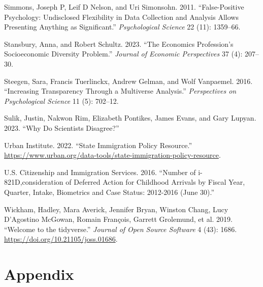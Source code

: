 \documentclass[
  letterpaper,
  DIV=11,
  numbers=noendperiod]{scrartcl}
\newlength{\cslhangindent}
\newlength{\cslentryspacingunit} %
\newenvironment{CSLReferences}[2] %
 {%
  \setlength{\parindent}{0pt}
  \ifodd #1
  \let\oldpar\par
  \def\par{\hangindent=\cslhangindent\oldpar}
  \fi
  \setlength{\parskip}{#2\cslentryspacingunit}
 }%
 {}
\begin{document}
\begin{CSLReferences}{1}{0}
\leavevmode{}%
Simmons, Joseph P, Leif D Nelson, and Uri Simonsohn. 2011.
{``False-Positive Psychology: Undisclosed Flexibility in Data Collection
and Analysis Allows Presenting Anything as Significant.''}
\emph{Psychological Science} 22 (11): 1359--66.

\leavevmode{}%
Stansbury, Anna, and Robert Schultz. 2023. {``The Economics Profession's
Socioeconomic Diversity Problem.''} \emph{Journal of Economic
Perspectives} 37 (4): 207--30.

\leavevmode{}%
Steegen, Sara, Francis Tuerlinckx, Andrew Gelman, and Wolf Vanpaemel.
2016. {``Increasing Transparency Through a Multiverse Analysis.''}
\emph{Perspectives on Psychological Science} 11 (5): 702--12.

\leavevmode{}%
Sulik, Justin, Nakwon Rim, Elizabeth Pontikes, James Evans, and Gary
Lupyan. 2023. {``Why Do Scientists Disagree?''}

\leavevmode{}%
Urban Institute. 2022. {``State Immigration Policy Resource.''}
\url{https://www.urban.org/data-tools/state-immigration-policy-resource}.

\leavevmode{}%
U.S. Citizenship and Immigration Services. 2016. {``Number of
i-821D,consideration of Deferred Action for Childhood Arrivals by Fiscal
Year, Quarter, Intake, Biometrics and Case Status: 2012-2016 (June
30).''}

\leavevmode{}%
Wickham, Hadley, Mara Averick, Jennifer Bryan, Winston Chang, Lucy
D'Agostino McGowan, Romain François, Garrett Grolemund, et al. 2019.
{``Welcome to the {tidyverse}.''} \emph{Journal of Open Source Software}
4 (43): 1686. \url{https://doi.org/10.21105/joss.01686}.

\end{CSLReferences}

\FloatBarrier

\appendix

\hypertarget{appendix}{%
\section*{Appendix}\label{appendix}}
\end{document}
